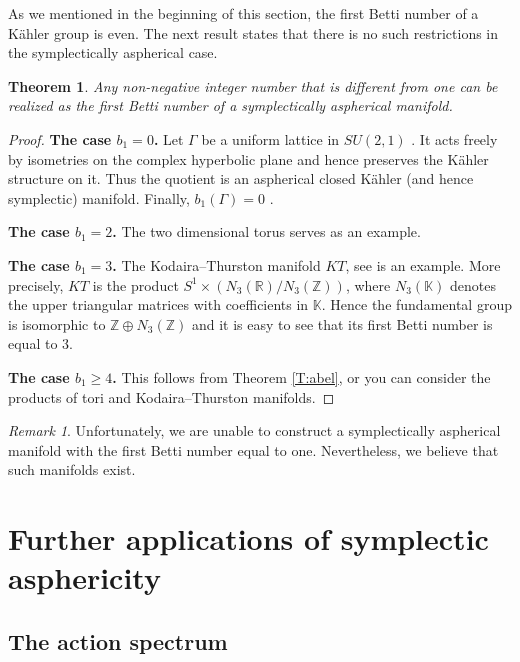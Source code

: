 \documentclass[12pt]{amsart}
\newcommand{\B}[1]{{\mathbb #1}}
\newtheorem{theorem}[subsection]{Theorem}%
\numberwithin{equation}{section}
\theoremstyle{definition}
\theoremstyle{remark}
\newtheorem{remark}[subsection]{Remark}
\numberwithin{figure}{section}
\numberwithin{table}{section}
\newcommand{\Ga}{{\Gamma}}
\newcommand{\ms}{{\medskip}}
\begin{document}
\ms 
As we mentioned in the beginning of this section, 
the first Betti number of a K\"ahler 
group is even. The next result 
states that there is no such restrictions in the 
symplectically aspherical case. 
 
\begin{theorem} 
Any non-negative integer number that is different from one can be realized as 
the first Betti number of 
a symplectically aspherical manifold. 
\end{theorem} 
 
\begin{proof} 
{\bf The case $b_1=0$.} Let $\Ga$ be a uniform lattice in $SU(2,1)$ 
. It acts 
freely by isometries on the complex hyperbolic plane and hence 
preserves the K\"ahler structure on it. Thus the quotient is an 
aspherical closed K\"ahler (and hence symplectic) manifold. Finally, 
$b_1(\Gamma)=0$ \cite{G, Ma}. 
 
{\bf The case $b_1=2$.} The two dimensional torus serves as an example. 
 
{\bf The case $b_1=3$.} The Kodaira--Thurston manifold $KT$, see \cite{MS1} is 
an example. 
More precisely, $KT$ is the product $S^1 \times (N_3(\B R)/N_3(\B Z))$, 
where $N_3(\B K)$ denotes the upper triangular matrices with 
coefficients in $\B K$. Hence the fundamental group is 
isomorphic to $\B Z\oplus N_3(\B Z)$ and it is easy to 
see that its first Betti number is equal to 3. 
 
{\bf The case $b_1\ge 4$.} This follows from Theorem \ref{T:abel}, or you can 
consider the products of tori and Kodaira--Thurston manifolds. 
\end{proof} 
 
\begin{remark} 
Unfortunately, we are unable to construct a symplectically aspherical 
manifold with the first Betti number equal to one. Nevertheless, 
we believe that such manifolds exist. 
\end{remark} 
 
 
\section{Further applications of symplectic asphericity} 
\label{S:applications} 
 
\subsection{The action spectrum} 
\label{SS:schwarz} 
 
\end{document}
